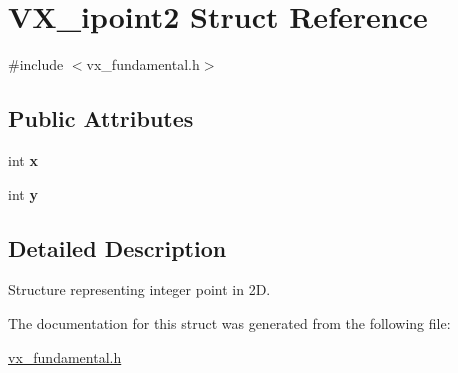 \hypertarget{structVX__ipoint2}{\section{V\-X\-\_\-ipoint2 Struct Reference}
\label{structVX__ipoint2}
}


{\ttfamily \#include $<$vx\-\_\-fundamental.\-h$>$}

\subsection*{Public Attributes}
\begin{DoxyCompactItemize}
\item 
\hypertarget{structVX__ipoint2_a16e7cd5a2ddfe0f54189e98196d3df24}{int {\bfseries x}}\label{structVX__ipoint2_a16e7cd5a2ddfe0f54189e98196d3df24}

\item 
\hypertarget{structVX__ipoint2_a407b201f2cb97acc7c1e4fed83215482}{int {\bfseries y}}\label{structVX__ipoint2_a407b201f2cb97acc7c1e4fed83215482}

\end{DoxyCompactItemize}


\subsection{Detailed Description}
Structure representing integer point in 2\-D. 

The documentation for this struct was generated from the following file\-:\begin{DoxyCompactItemize}
\item 
\hyperlink{vx__fundamental_8h}{vx\-\_\-fundamental.\-h}\end{DoxyCompactItemize}
